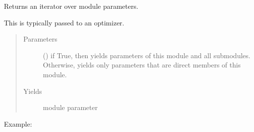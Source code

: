\documentclass[letterpaper,10pt,english]{sphinxmanual}
\begin{document}
\begin{fulllineitems}
\begin{fulllineitems}
\end{fulllineitems}


\begin{fulllineitems}
\label{\detokenize{api/autoencoding:geology.metamodelling.SpatialAutoencoder.parameters}}
Returns an iterator over module parameters.

This is typically passed to an optimizer.
\begin{quote}\begin{description}
\item[{Parameters}] \leavevmode
{} () \textendash{} if True, then yields parameters of this module
and all submodules. Otherwise, yields only parameters that
are direct members of this module.

\item[{Yields}] \leavevmode
{} \textendash{} module parameter

\end{description}\end{quote}

Example:

\begin{sphinxVerbatim}[commandchars=\\\{\}]
   
     
\end{sphinxVerbatim}

\end{fulllineitems}



\end{fulllineitems}
\end{document}
